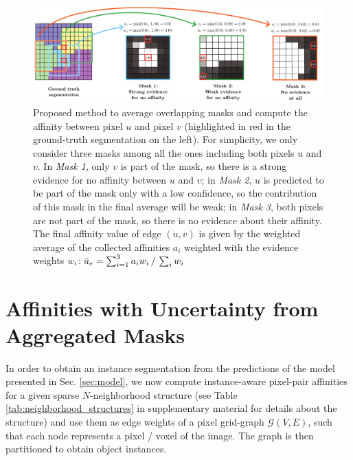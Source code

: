 \begin{figure}[t]
\centering
        \includegraphics[width=\textwidth]{./figures/LSIMasks/mask_aggregation.pdf} %
        \caption{Proposed method to average overlapping masks and compute the affinity between pixel $u$ and pixel $v$ (highlighted in red in the ground-truth segmentation on the left). For simplicity, we only consider three masks among all the ones including both pixels $u$ and $v$. 
        In \emph{Mask 1}, only $v$ is part of the mask, so there is a strong evidence for no affinity between $u$ and $v$; in \emph{Mask 2},  $u$ is predicted to be part of the mask only with a low confidence, so the contribution of this mask in the final average will be weak; in \emph{Mask 3}, both pixels are not part of the \maskname mask, so there is no evidence about their affinity. 
        The final affinity value of edge $(u,v)$ is given by the weighted average of the collected affinities $a_i$ weighted with the evidence weights $w_i$: $\bar{a}_e= \sum_{i=1}^3 a_i w_i\,/\,\sum_{i}w_i$
        }
    \label{fig:alg_explained}
\end{figure}


\section{Affinities with Uncertainty from Aggregated Masks}\label{sec:aggr_affs}
In order to obtain an instance segmentation from the predictions of the model presented in Sec. \ref{sec:model}, we now compute instance-aware pixel-pair affinities for a given sparse $N$-neighborhood structure (see Table \ref{tab:neighborhood_structures} in supplementary material for details about the structure) and use them as edge weights of a pixel grid-graph $\mathcal{G}(V,E)$, such that each node represents a pixel / voxel of the image. The graph is then partitioned to obtain object instances.

